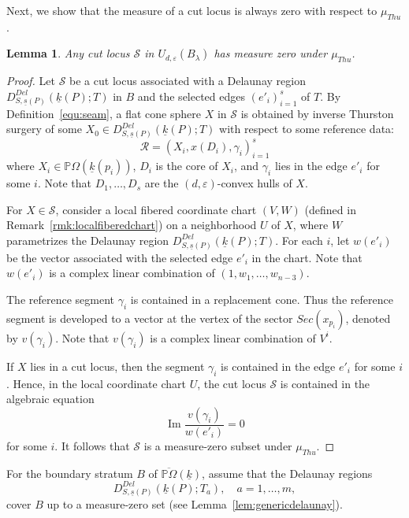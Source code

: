\documentclass{compositio}
\numberwithin{equation}{section}
\numberwithin{figure}{section}
\theoremstyle{definition}
\theoremstyle{plain}
\newtheorem{lemma}[definition]{Lemma}
\begin{document}
{Next, we show that the measure of a cut locus is always zero with respect to $\mu_{Thu}$.

\begin{lemma}\label{lem:seamisofmeasurezero}
 Any cut locus $\mathcal{S}$ in $U_{d,\varepsilon}(B_\lambda)$ has measure zero under $\mu_{Thu}$.
\end{lemma}

\begin{proof}
Let $\mathcal{S}$ be a cut locus associated with a Delaunay region $D_{S,\underline{s}(P)}^{Del}(\underline{k}(P);T)$ in $B$ and the selected edges $(e'_i)_{i=1}^s$ of $T$. By Definition~\eqref{equ:seam}, a flat cone sphere $X$ in $\mathcal{S}$ is obtained by inverse Thurston surgery of some $X_0\in D_{S,\underline{s}(P)}^{Del}(\underline{k}(P);T)$ with respect to some reference data:
\begin{equation}
    \mathcal{R} = (X_i, x(D_i),\gamma_i)_{i=1}^s
\end{equation}
where $X_i \in \mathbb{P}\Omega(\underline{k}(p_i))$, $D_i$ is the core of $X_i$, and $\gamma_i$ lies in the edge $e'_i$ for some $i$. Note that $D_1, \ldots, D_s$ are the $(d, \varepsilon)$-convex hulls of $X$.

For $X\in\mathcal{S}$, consider a local fibered coordinate chart $(V,W)$ (defined in Remark~\ref{rmk:localfiberedchart}) on a neighborhood $U$ of $X$, where $W$ parametrizes the Delaunay region $D_{S,\underline{s}(P)}^{Del}(\underline{k}(P);T)$. For each $i$, let $w(e'_i)$ be the vector associated with the selected edge $e'_i$ in the chart. Note that $w(e'_i)$ is a complex linear combination of $(1,w_1,\ldots,w_{n-3})$.

The reference segment $\gamma_i$ is contained in a replacement cone. Thus the reference segment is developed to a vector at the vertex of the sector $Sec(x_{p_i})$, denoted by $v(\gamma_i)$. Note that $v(\gamma_i)$ is a complex linear combination of $V^i$.

If $X$ lies in a cut locus, then the segment $\gamma_i$ is contained in the edge $e'_i$ for some $i$. Hence, in the local coordinate chart $U$, the cut locus $\mathcal{S}$ is contained in the algebraic equation
$$
\operatorname{Im} \frac{v(\gamma_i)}{w(e'_i)} = 0
$$
for some $i$. It follows that $\mathcal{S}$ is a measure-zero subset under $\mu_{Thu}$.
\end{proof}

For the boundary stratum $B$ of $\overline{\mathbb{P}\Omega}(\underline{k})$, assume that the Delaunay regions
$$D_{S,\underline{s}(P)}^{Del}(\underline{k}(P);T_a), \quad a=1,\ldots,m,$$
cover $B$ up to a measure-zero set (see Lemma~\ref{lem:genericdelaunay}).

}
\end{document}
